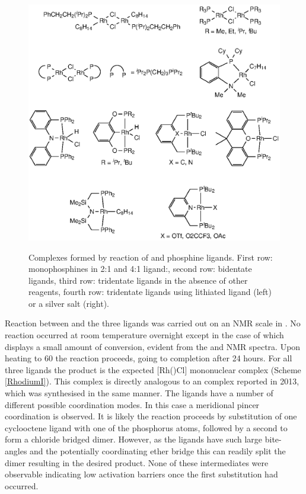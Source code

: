 \begin{figure}[h!]
\begin{center}
\vspace{0.5cm}
\includegraphics{../Figures/RhCOEClcomplexes.eps}
\caption[Complexes formed by reaction of  and phosphine ligands]{Complexes formed by reaction of  and phosphine ligands.  First row: monophosphines in 2:1 and 4:1 ligand:, second row: bidentate ligands, third row: tridentate ligands in the absence of other reagents, fourth row: tridentate ligands using lithiated ligand (left) or a silver salt (right).}
\vspace{0.2cm}
\label{RhCOEClcomplexes}
\end{center}
\end{figure}
\vspace{0.2cm}

Reaction between  and the three \tBuxantphos{} ligands was carried out on an NMR scale in .  No reaction occurred at room temperature overnight except in the case of \tBuxantphos{} which displays a small amount of conversion, evident from the \proton{} and \phosphorus{} NMR spectra.  Upon heating to 60 \degC{} the reaction proceeds, going to completion after 24 hours.  For all three \tBuxantphos{} ligands the product is the expected [Rh(\tBuxantphosk)Cl] mononuclear complex (Scheme \ref{RhodiumI}).  This complex is directly analogous to an \iPrxantphos{} complex reported in 2013\cite{Esteruelas2013}, which was synthesised in the same manner.  The \tBuxantphos{} ligands have a number of different possible coordination modes.  In this case a meridional \POP{} pincer coordination is observed.  It is likely the reaction proceeds by substitution of one cyclooctene ligand with one of the phosphorus atoms, followed by a second to form a chloride bridged dimer.  However, as the \tBuxantphos{} ligands have such large bite-angles and the potentially coordinating ether bridge this can readily split the dimer resulting in the desired product.  None of these intermediates were observable indicating low activation barriers once the first substitution had occurred.  

